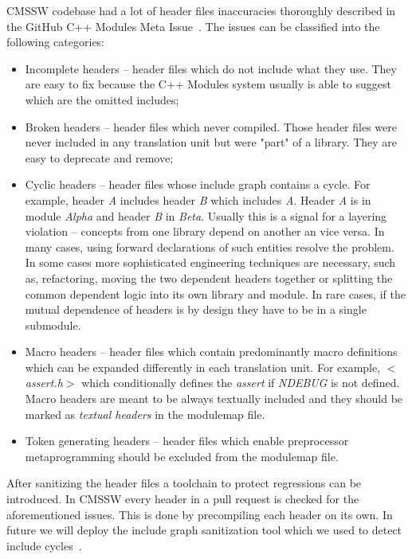 \documentclass[12pt]{iopart}
\begin{document}
CMSSW codebase had a lot of header files inaccuracies thoroughly described in the GitHub C++ Modules Meta Issue~\cite{Modules-gh-metaissue}. The issues can be classified into the following categories:
\begin{itemize}
    \item Incomplete headers -- header files which do not include what they use. They are easy to fix because the C++ Modules system usually is able to suggest which are the omitted includes;
    \item Broken headers -- header files which never compiled. Those header files were never included in any translation unit but were "part" of a library. They are easy to deprecate and remove;
    \item Cyclic headers -- header files whose include graph contains a cycle. For example, header \textit{A} includes header \textit{B} which includes \textit{A}. Header \textit{A} is in module \textit{Alpha} and header \textit{B} in \textit{Beta}. Usually this is a signal for a layering violation -- concepts from one library depend on another an vice versa. In many cases, using forward declarations of such entities resolve the problem. In some cases more sophisticated engineering techniques are necessary, such as, refactoring, moving the two dependent headers together or splitting the common dependent logic into its own library and module. In rare cases, if the mutual dependence of headers is by design they have to be in a single submodule.
    \item Macro headers -- header files which contain predominantly macro definitions which can be expanded differently in each translation unit. For example, \textit{$<$assert.h$>$} which conditionally defines the \textit{assert} if \textit{NDEBUG} is not defined. Macro headers are meant to be always textually included and they should be marked as \textit{textual headers} in the modulemap file. 
    \item Token generating headers -- header files which enable preprocessor metaprogramming should be excluded from the modulemap file.
\end{itemize}

After sanitizing the header files a toolchain to protect regressions can be introduced. In CMSSW every header in a pull request is checked for the aforementioned issues. This is done by precompiling each header on its own. In future we will deploy the include graph sanitization tool which we used to detect include cycles~\cite{scram-cycle-break}.
\end{document}
